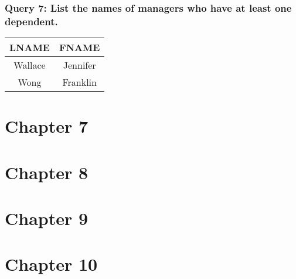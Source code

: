 \documentclass[11pt, oneside]{article}   	%
\begin{document}
\subsubsection*{Query 7: List the names of managers who have at least one dependent.}
\begin{center}
\begin{tabular}{ c | c }
  LNAME & FNAME \\ \hline
  Wallace & Jennifer \\
  Wong & Franklin \\
\end{tabular}
\end{center}

\section*{Chapter 7}
\section*{Chapter 8}
\section*{Chapter 9}
\section*{Chapter 10}
\end{document}
